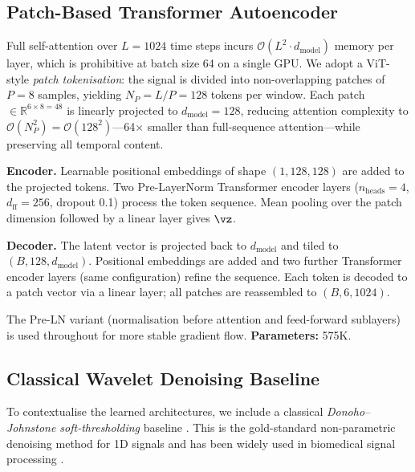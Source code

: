\documentclass{article}
\begin{document}
\subsection{Patch-Based Transformer Autoencoder}
\label{sec:transformer}

Full self-attention over $L = 1024$ time steps incurs
$\mathcal{O}(L^2 \cdot d_\text{model})$ memory per layer, which is prohibitive
at batch size 64 on a single GPU.
We adopt a ViT-style \citep{dosovitskiy2021vit} \emph{patch tokenisation}:
the signal is divided into non-overlapping patches of $P = 8$ samples,
yielding $N_P = L/P = 128$ tokens per window.
Each patch $\in \mathbb{R}^{6 \times 8 = 48}$ is linearly projected to
$d_\text{model} = 128$, reducing attention complexity to
$\mathcal{O}(N_P^2) = \mathcal{O}(128^2)$---64$\times$ smaller than
full-sequence attention---while preserving all temporal content.

\textbf{Encoder.}
Learnable positional embeddings of shape $(1, 128, 128)$ are added to the
projected tokens.
Two Pre-LayerNorm Transformer encoder layers ($n_\text{heads} = 4$,
$d_\text{ff} = 256$, dropout 0.1) \citep{vaswani2017attention} process
the token sequence.
Mean pooling over the patch dimension followed by a linear layer gives $\vz$.

\textbf{Decoder.}
The latent vector is projected back to $d_\text{model}$ and tiled to
$(B, 128, d_\text{model})$.
Positional embeddings are added and two further Transformer encoder layers
(same configuration) refine the sequence.
Each token is decoded to a patch vector via a linear layer;
all patches are reassembled to $(B, 6, 1024)$.

The Pre-LN variant \citep{vaswani2017attention} (normalisation before attention
and feed-forward sublayers) is used throughout for more stable gradient flow.
\textbf{Parameters:} 575K.

\subsection{Classical Wavelet Denoising Baseline}
\label{sec:wavelet}

To contextualise the learned architectures, we include a classical
\emph{Donoho--Johnstone soft-thresholding} baseline \citep{donoho1995wavelet}.
This is the gold-standard non-parametric denoising method for 1D signals and
has been widely used in biomedical signal processing
\citep{reaz2007techniques,klucken2013unbiased}.
\end{document}
